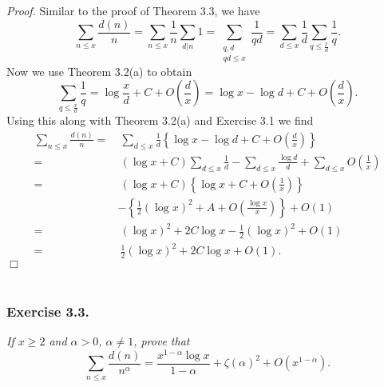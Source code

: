 \documentclass{article}
\begin{document}
\emph{Proof.}
  Similar to the proof of Theorem 3.3, we have
  \[
    \sum_{n \leq x} \frac{d(n)}{n}
    = \sum_{n \leq x} \frac{1}{n} \sum_{d|n} 1
    = \sum_{\substack{q,d \\ qd \leq x}} \frac{1}{qd}
    = \sum_{d \leq x} \frac{1}{d} \sum_{q \leq \frac{x}{d}} \frac{1}{q}.
  \]
  Now we use Theorem 3.2(a) to obtain
  \[
    \sum_{q \leq \frac{x}{d}} \frac{1}{q}
    = \log\frac{x}{d} + C + O\left(\frac{d}{x}\right)
    = \log x - \log d + C + O\left(\frac{d}{x}\right).
  \]
  Using this along with Theorem 3.2(a) and Exercise 3.1 we find
  \begin{align*}
    \sum_{n \leq x} \frac{d(n)}{n}
    =& \: \sum_{d \leq x}
        \frac{1}{d} \left\{ \log x - \log d + C + O\left(\frac{d}{x}\right) \right\} \\
    =& \: (\log x + C) \sum_{d \leq x} \frac{1}{d}
        - \sum_{d \leq x} \frac{\log d}{d} + \sum_{d \leq x} O\left(\frac{1}{x}\right) \\
    =& \: (\log x + C)\left\{ \log x + C + O\left(\frac{1}{x}\right) \right\} \\
      & - \left\{ \frac{1}{2} (\log x)^2 + A + O\left( \frac{\log x}{x} \right) \right\} + O(1) \\
    =& \: (\log x)^2 + 2 C \log x - \frac{1}{2} (\log x)^2 + O(1) \\
    =& \: \frac{1}{2} (\log x)^2 + 2C \log x + O(1).
  \end{align*}
$\Box$ \\\\






\subsubsection*{Exercise 3.3.}
\emph{If $x \geq 2$ and $\alpha > 0$, $\alpha \neq 1$, prove that
\[
  \sum_{n \leq x} \frac{d(n)}{n^{\alpha}}
  = \frac{x^{1-\alpha} \log x}{1 - \alpha} + \zeta(\alpha)^2 + O(x^{1-\alpha}).
\]}
\end{document}
